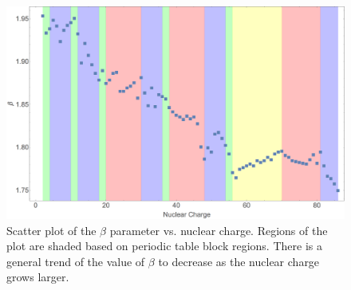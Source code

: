\begin{figure}
\center
\includegraphics[width=1\textwidth]{Figures/BS_non_rel_beta.png}
\caption[Scatter plot of the $\beta$ parameter vs. nuclear charge.]
{Scatter plot of the $\beta$ parameter vs. nuclear charge. Regions of the plot are shaded based on periodic table block regions. There is a general trend of the value of $\beta$ to decrease as the nuclear charge grows larger.}
\label{fig:BS_non_rel_beta}
\end{figure}

